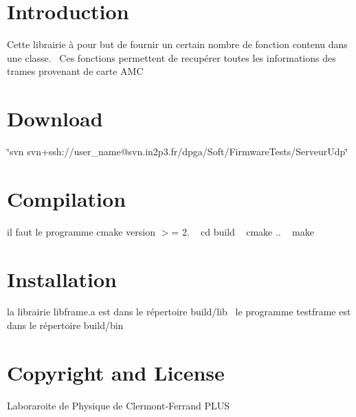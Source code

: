 \hypertarget{index_intro_sec}{}\section{Introduction}\label{index_intro_sec}
Cette librairie à pour but de fournir un certain nombre de fonction contenu dans une classe.~\newline
 Ces fonctions permettent de recupérer toutes les informations des trames provenant de carte A\+MC\hypertarget{index_Download_sec}{}\section{Download}\label{index_Download_sec}
\char`\"{}svn svn+ssh\+://user\+\_\+name@svn.\+in2p3.\+fr/dpga/\+Soft/\+Firmware\+Tests/\+Serveur\+Udp\char`\"{}\hypertarget{index_Compilation_sec}{}\section{Compilation}\label{index_Compilation_sec}
il faut le programme cmake version $>$= 2. ~\newline
 cd build ~\newline
 cmake .. ~\newline
 make ~\newline
\hypertarget{index_install_sec}{}\section{Installation}\label{index_install_sec}
la librairie libframe.\+a est dans le répertoire build/lib~\newline
 le programme testframe est dans le répertoire build/bin\hypertarget{index_copyright}{}\section{Copyright and License}\label{index_copyright}
Laboraroite de Physique de Clermont-\/\+Ferrand P\+L\+US 

~\newline
~\newline
 